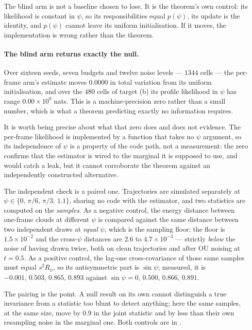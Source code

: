 The blind arm is not a baseline chosen to lose. It is the theorem's own
control: its likelihood is constant in $\psi$, so its responsibilities equal
$p(\psi)$, its update is the identity, and $p(\psi)$ cannot leave its uniform
initialisation. If it moves, the implementation is wrong rather than the
theorem.

\paragraph{The blind arm returns exactly the null.} Over sixteen seeds, seven
budgets and twelve noise levels --- $1344$ cells --- the per-frame arm's
estimate moves $0.0000$ in total variation from its uniform initialisation,
and over the $480$ cells of target (b) its profile likelihood in $\psi$ has
range $0.00\times10^{0}$ nats. This is a machine-precision zero rather than a
small number, which is what a theorem predicting exactly no information
requires.

It is worth being precise about what that zero does and does not evidence. The
per-frame likelihood is implemented by a function that takes no $\psi$
argument, so its independence of $\psi$ is a property of the code path, not a
measurement: the zero confirms that the estimator is wired to the marginal it
is supposed to use, and would catch a leak, but it cannot corroborate the
theorem against an independently constructed alternative.

The independent check is a paired one. Trajectories are simulated separately at
$\psi \in \{0,\,\pi/6,\,\pi/3,\,1.1\}$, sharing no code with the estimator, and
two statistics are computed on the \emph{samples}. As a negative control, the
energy distance between one-frame clouds at different $\psi$ is compared
against the same distance between two independent draws at \emph{equal} $\psi$,
which is the sampling floor: the floor is $1.5\times10^{-2}$ and the
cross-$\psi$ distances are $2.6$ to $4.7\times10^{-3}$ --- strictly
\emph{below} the noise of having drawn twice, both on clean trajectories and
after OU noising at $t=0.5$. As a positive control, the lag-one cross-covariance
of those same samples must equal $s^2 R_\psi$, so its antisymmetric part is
$\sin\psi$; measured, it is $-0.001,\,0.503,\,0.865,\,0.893$ against
$\sin\psi = 0,\,0.500,\,0.866,\,0.891$.

The pairing is the point. A null result on its own cannot distinguish a true
invariance from a statistic too blunt to detect anything; here the same
samples, at the same size, move by $0.9$ in the joint statistic and by less
than their own resampling noise in the marginal one. Both controls are in
.

